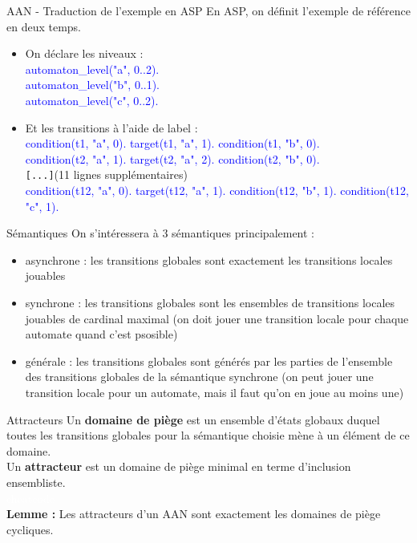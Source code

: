 \documentclass{beamer}
\begin{document}
\begin{frame}{AAN - Traduction de l'exemple en ASP}
	En ASP, on définit l'exemple de référence en deux temps.\\
	\begin{itemize}
		\pause
		\item On déclare les niveaux : \\
			\textcolor{blue}{
			automaton\_level("a", 0..2).\\
			automaton\_level("b", 0..1).\\
			automaton\_level("c", 0..2).\\
			}
		\pause
		\item Et les transitions à l'aide de label : \\
			\textcolor{blue}{
			condition(t1, "a", 0). target(t1, "a", 1). condition(t1, "b", 0).\\
			condition(t2, "a", 1). target(t2, "a", 2). condition(t2, "b", 0).}\\
			\verb![...]!(11 lignes supplémentaires)\\
			\textcolor{blue}{condition(t12, "a", 0). target(t12, "a", 1). condition(t12, "b", 1). condition(t12, "c", 1).\\
			}
	\end{itemize}
\end{frame}

\begin{frame}{Sémantiques}
	On s'intéressera à 3 sémantiques principalement : 
	\begin{itemize}
		\pause
		\item asynchrone : les transitions globales sont exactement les transitions locales jouables
		\pause
		\item synchrone : les transitions globales sont les ensembles de transitions locales jouables de cardinal maximal (on doit jouer une transition locale pour chaque automate quand c'est psosible)
		\pause
		\item générale : les transitions globales sont générés par les parties de l'ensemble des transitions globales de la sémantique synchrone (on peut jouer une transition locale pour un automate, mais il faut qu'on en 
		joue au moins une)
	\end{itemize}
\end{frame}

\begin{frame}{Attracteurs}
	\pause
	Un \textbf{domaine de piège} est un ensemble d'états globaux duquel toutes les transitions globales pour la sémantique choisie mène à un élément de ce domaine.\\
	\pause
	Un \textbf{attracteur} est un domaine de piège minimal en terme d'inclusion ensembliste.\\
	\pause
	\textcolor{white}{cheatcode}\\
	\textbf{Lemme :} Les attracteurs d'un AAN sont exactement les domaines de piège cycliques.
\end{frame}
\end{document}
